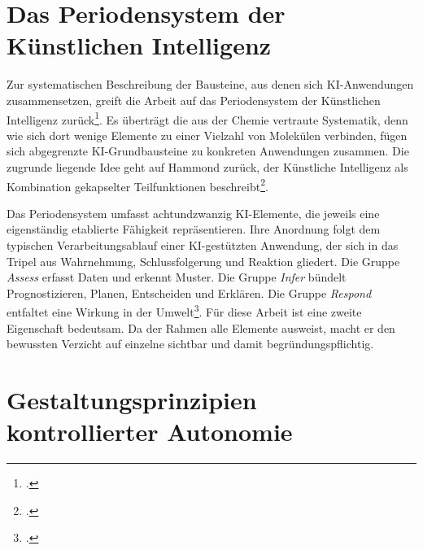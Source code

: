 \section{Das Periodensystem der Künstlichen Intelligenz}
\label{sec:grundlagen-periodensystem}

Zur systematischen Beschreibung der Bausteine, aus denen sich KI-Anwendungen
zusammensetzen, greift die Arbeit auf das Periodensystem der Künstlichen Intelligenz
zurück\footcite[vgl.][S.~15\,f.]{bitkom2018}. Es überträgt die aus der Chemie
vertraute Systematik, denn wie sich dort wenige
Elemente zu einer Vielzahl von Molekülen verbinden, fügen sich abgegrenzte
KI-Grundbausteine zu konkreten Anwendungen zusammen. Die zugrunde liegende Idee geht auf Hammond
zurück, der Künstliche Intelligenz als Kombination gekapselter Teilfunktionen
beschreibt\footcites[vgl.][S.~15]{bitkom2018}[vgl.][]{hammond2016}.

Das Periodensystem umfasst achtundzwanzig KI-Elemente, die jeweils eine eigenständig
etablierte Fähigkeit repräsentieren. Ihre Anordnung folgt dem typischen
Verarbeitungsablauf einer KI-gestützten Anwendung, der sich in das Tripel aus
Wahrnehmung, Schlussfolgerung und Reaktion gliedert. Die Gruppe \textit{Assess} erfasst Daten und erkennt Muster. Die Gruppe \textit{Infer} bündelt Prognostizieren, Planen, Entscheiden und Erklären. Die Gruppe \textit{Respond} entfaltet eine Wirkung in der Umwelt\footcite[vgl.][S.~15, 17\,f.]{bitkom2018}. Für diese Arbeit ist eine
zweite Eigenschaft bedeutsam. Da der Rahmen alle Elemente ausweist, macht er den
bewussten Verzicht auf einzelne sichtbar und damit begründungspflichtig.

\section{Gestaltungsprinzipien kontrollierter Autonomie}
\label{sec:grundlagen-prinzipien}


